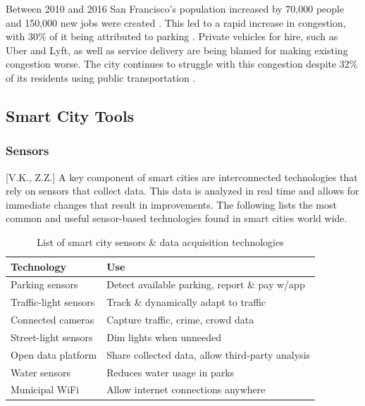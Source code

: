 \documentclass[12pt]{article}                       %
\begin{document}
Between 2010 and 2016 San Francisco's population increased by 70,000 people and 150,000 new jobs were created \cite{Marshall2018UberComplicated}. This led to a rapid increase in congestion, with 30\% of it being attributed to parking \cite{Marshall2018UberComplicated}. Private vehicles for hire, such as Uber and Lyft, as well as service delivery are being blamed for making existing congestion worse. The city continues to struggle with this congestion despite 32\% of its residents using public transportation \cite{Marshall2018UberComplicated}. 

\subsection{Smart City Tools} 
\subsubsection{Sensors}[V.K., Z.Z.] \label{sec:smart_city_sensors}
A key component of smart cities are interconnected technologies that rely on sensors that collect data. This data is analyzed in real time and allows for immediate changes that result in improvements. The following lists the most common and useful sensor-based technologies found in smart cities world wide. 

\begin{table}[H]
    \centering
    \small
    \begin{tabular}{l|l}
        \textbf{Technology} & \textbf{Use} \\
        \hline{}
        
        Parking sensors &
        Detect available parking, report \& pay w/app \\
        \hline{}
        
        Traffic-light sensors &
        Track \& dynamically adapt to traffic \\
        \hline{}
        
        Connected cameras &
        Capture traffic, crime, crowd data \\
        \hline{}
        
        Street-light sensors &
        Dim lights when unneeded \\
        \hline{}
        
        Open data platform &
        Share collected data, allow third-party analysis \\
        \hline{}
        
        Water sensors &
        Reduces water usage in parks \\
        \hline{}
        
        Municipal WiFi &
        Allow internet connections anywhere
    \end{tabular}
    \caption{List of smart city sensors \& data acquisition technologies}
    \label{tab:smart_city_sensors}
\end{table}
\end{document}
